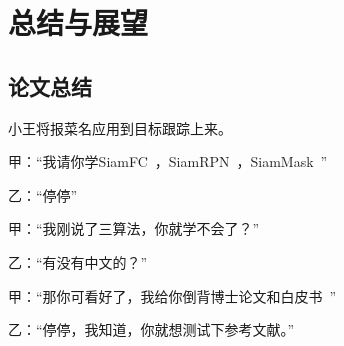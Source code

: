 \chapter{总结与展望}

\section{论文总结}
小王将报菜名应用到目标跟踪上来。

甲：“我请你学SiamFC~\cite{SiamFC}，SiamRPN~\cite{SiamRPN}，SiamMask~\cite{SiamMask}”

乙：“停停”

甲：“我刚说了三算法，你就学不会了？”

乙：“有没有中文的？”

甲：“那你可看好了，我给你倒背博士论文\cite{卢莉萍}和白皮书~\cite{白皮书2018}”

乙：“停停，我知道，你就想测试下参考文献。”